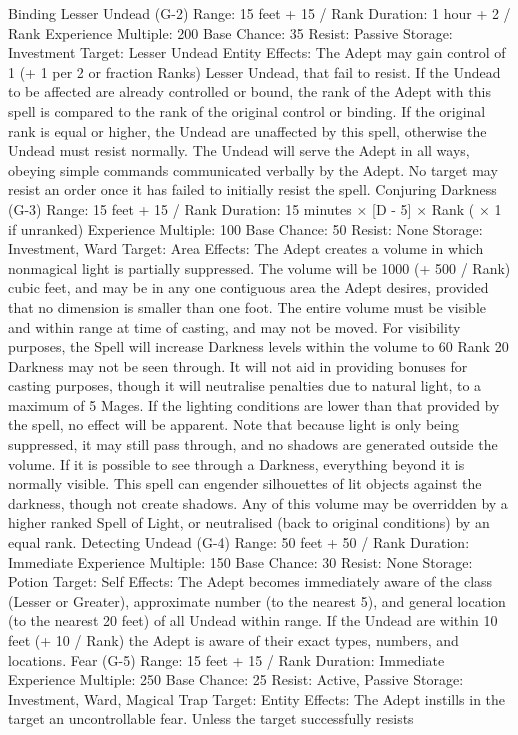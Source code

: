 \documentclass[a4paper]{article}
\begin{document}
\begin{multicols}{3}
Binding Lesser Undead (G-2)
Range: 15 feet + 15 / Rank
Duration: 1 hour + 2 / Rank
Experience Multiple: 200
Base Chance: 35%
Resist: Passive
Storage: Investment
Target: Lesser Undead Entity
Effects: The Adept may gain control of 1 (+ 1 per 2
or fraction Ranks) Lesser Undead, that fail to resist. If the Undead to be affected are already controlled or bound, the rank of the Adept with this
spell is compared to the rank of the original control
or binding. If the original rank is equal or higher,
the Undead are unaffected by this spell, otherwise
the Undead must resist normally. The Undead will
serve the Adept in all ways, obeying simple commands communicated verbally by the Adept. No
target may resist an order once it has failed to
initially resist the spell.
Conjuring Darkness (G-3)
Range: 15 feet + 15 / Rank
Duration: 15 minutes × [D - 5] × Rank ( × 1 if
unranked)
Experience Multiple: 100
Base Chance: 50%
Resist: None
Storage: Investment, Ward
Target: Area
Effects: The Adept creates a volume in which nonmagical light is partially suppressed. The volume
will be 1000 (+ 500 / Rank) cubic feet, and may be
in any one contiguous area the Adept desires, provided that no dimension is smaller than one foot.
The entire volume must be visible and within range
at time of casting, and may not be moved. For
visibility purposes, the Spell will increase Darkness levels within the volume to 60%
Rank 20 Darkness may not be seen through. It will
not aid in providing bonuses for casting purposes,
though it will neutralise penalties due to natural
light, to a maximum of 5%
Mages. If the lighting conditions are lower than
that provided by the spell, no effect will be apparent. Note that because light is only being suppressed, it may still pass through, and no shadows
are generated outside the volume. If it is possible to
see through a Darkness, everything beyond it is
normally visible. This spell can engender silhouettes of lit objects against the darkness, though not
create shadows. Any of this volume may be overridden by a higher ranked Spell of Light, or neutralised (back to original conditions) by an equal
rank.
Detecting Undead (G-4)
Range: 50 feet + 50 / Rank
Duration: Immediate
Experience Multiple: 150
Base Chance: 30%
Resist: None
Storage: Potion
Target: Self
Effects: The Adept becomes immediately aware of
the class (Lesser or Greater), approximate number
(to the nearest 5), and general location (to the
nearest 20 feet) of all Undead within range. If the
Undead are within 10 feet (+ 10 / Rank) the Adept
is aware of their exact types, numbers, and locations.
Fear (G-5)
Range: 15 feet + 15 / Rank
Duration: Immediate
Experience Multiple: 250
Base Chance: 25%
Resist: Active, Passive
Storage: Investment, Ward, Magical Trap
Target: Entity
Effects: The Adept instills in the target an uncontrollable fear. Unless the target successfully resists


\end{multicols}
\end{document}

